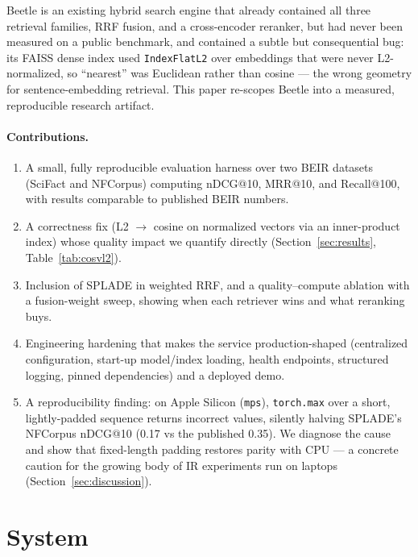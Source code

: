 \documentclass[11pt]{article}
\begin{document}
Beetle is an existing hybrid search engine that already contained all three
retrieval families, RRF fusion, and a cross-encoder reranker, but had never been
measured on a public benchmark, and contained a subtle but consequential bug: its
FAISS dense index used \texttt{IndexFlatL2} over embeddings that were never
L2-normalized, so ``nearest'' was Euclidean rather than cosine --- the wrong
geometry for sentence-embedding retrieval. This paper re-scopes Beetle into a
measured, reproducible research artifact.

\paragraph{Contributions.}
\begin{enumerate}
  \item A small, fully reproducible evaluation harness over two BEIR datasets
        (SciFact and NFCorpus) computing nDCG@10, MRR@10, and Recall@100,
        with results comparable to published BEIR numbers.
  \item A correctness fix (L2 $\rightarrow$ cosine on normalized vectors via an
        inner-product index) whose quality impact we quantify directly
        (Section~\ref{sec:results}, Table~\ref{tab:cosvl2}).
  \item Inclusion of SPLADE in weighted RRF, and a quality--compute ablation with a
        fusion-weight sweep, showing when each retriever wins and what reranking
        buys.
  \item Engineering hardening that makes the service production-shaped
        (centralized configuration, start-up model/index loading, health
        endpoints, structured logging, pinned dependencies) and a deployed demo.
  \item A reproducibility finding: on Apple Silicon (\texttt{mps}),
        \texttt{torch.max} over a short, lightly-padded sequence returns incorrect
        values, silently halving SPLADE's NFCorpus nDCG@10 (0.17 vs the published
        0.35). We diagnose the cause and show that fixed-length padding restores
        parity with CPU --- a concrete caution for the growing body of IR
        experiments run on laptops (Section~\ref{sec:discussion}).
\end{enumerate}

\section{System}
\label{sec:system}
\end{document}
